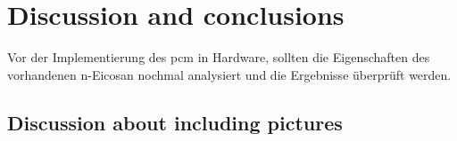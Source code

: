 \chapter{Discussion and conclusions}
\label{chap:conclusion}


Vor der Implementierung des \ac{pcm} in Hardware, sollten die Eigenschaften des vorhandenen n-Eicosan nochmal analysiert und die Ergebnisse überprüft werden.

\section{Discussion about including pictures}
